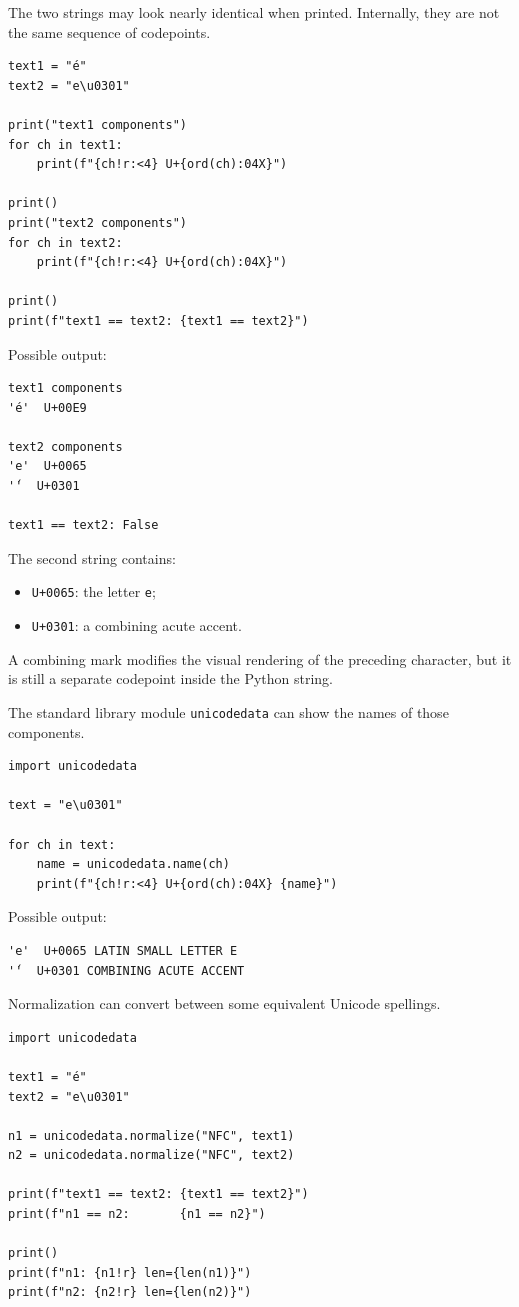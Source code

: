 The two strings may look nearly identical when printed. Internally, they are not the same sequence of codepoints.

\begin{verbatim}
text1 = "é"
text2 = "e\u0301"

print("text1 components")
for ch in text1:
    print(f"{ch!r:<4} U+{ord(ch):04X}")

print()
print("text2 components")
for ch in text2:
    print(f"{ch!r:<4} U+{ord(ch):04X}")

print()
print(f"text1 == text2: {text1 == text2}")
\end{verbatim}

Possible output:

\begin{verbatim}
text1 components
'é'  U+00E9

text2 components
'e'  U+0065
'́'  U+0301

text1 == text2: False
\end{verbatim}

The second string contains:

\begin{itemize}
    \item \texttt{U+0065}: the letter \texttt{e};
    \item \texttt{U+0301}: a combining acute accent.
\end{itemize}

A combining mark modifies the visual rendering of the preceding character, but it is still a separate codepoint inside the Python string.

The standard library module \texttt{unicodedata} can show the names of those components.

\begin{verbatim}
import unicodedata

text = "e\u0301"

for ch in text:
    name = unicodedata.name(ch)
    print(f"{ch!r:<4} U+{ord(ch):04X} {name}")
\end{verbatim}

Possible output:

\begin{verbatim}
'e'  U+0065 LATIN SMALL LETTER E
'́'  U+0301 COMBINING ACUTE ACCENT
\end{verbatim}

Normalization can convert between some equivalent Unicode spellings.

\begin{verbatim}
import unicodedata

text1 = "é"
text2 = "e\u0301"

n1 = unicodedata.normalize("NFC", text1)
n2 = unicodedata.normalize("NFC", text2)

print(f"text1 == text2: {text1 == text2}")
print(f"n1 == n2:       {n1 == n2}")

print()
print(f"n1: {n1!r} len={len(n1)}")
print(f"n2: {n2!r} len={len(n2)}")
\end{verbatim}

